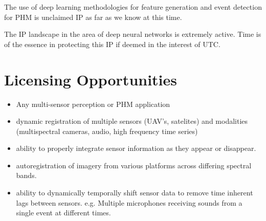 \documentclass{article}
\begin{document}
The use of deep learning methodologies for feature generation and event detection for PHM is unclaimed IP as far as we know at this time. 

The IP landscape in the area of deep neural networks is extremely active. Time is of the essence in protecting this IP if deemed in the interest of UTC. 

\section{Licensing Opportunities}
\begin{itemize}
\item  Any multi-sensor perception or PHM application
\item  dynamic registration of multiple sensors (UAV's, satelites) and modalities (multispectral cameras, audio, high frequency time series)
\item  ability to properly integrate sensor information as they appear or disappear. 
\item autoregistration of imagery from various platforms across differing spectral bands. 
\item ability to dynamically temporally shift sensor data to remove time inherent lags between sensors. e.g. Multiple microphones receiving sounds from a single event at different times. 
\end{itemize}



\end{document}
